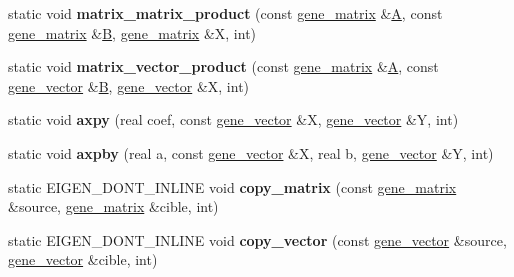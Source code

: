 \begin{DoxyCompactItemize}
\mbox{\label{classtensor__interface_a77f641ab91d01c341f26af6a5ee6c194}} 
static void {\bfseries matrix\+\_\+matrix\+\_\+product} (const \hyperlink{class_eigen_1_1_tensor}{gene\+\_\+matrix} \&\hyperlink{group___core___module_class_eigen_1_1_matrix}{A}, const \hyperlink{class_eigen_1_1_tensor}{gene\+\_\+matrix} \&\hyperlink{group___core___module_class_eigen_1_1_matrix}{B}, \hyperlink{class_eigen_1_1_tensor}{gene\+\_\+matrix} \&X, int)
\item 
\mbox{\label{classtensor__interface_a8c859c9a56554907eff907233548241a}} 
static void {\bfseries matrix\+\_\+vector\+\_\+product} (const \hyperlink{class_eigen_1_1_tensor}{gene\+\_\+matrix} \&\hyperlink{group___core___module_class_eigen_1_1_matrix}{A}, const \hyperlink{class_eigen_1_1_tensor}{gene\+\_\+vector} \&\hyperlink{group___core___module_class_eigen_1_1_matrix}{B}, \hyperlink{class_eigen_1_1_tensor}{gene\+\_\+vector} \&X, int)
\item 
\mbox{\label{classtensor__interface_a39db73e71870bccd9bf1003f00b6d921}} 
static void {\bfseries axpy} (real coef, const \hyperlink{class_eigen_1_1_tensor}{gene\+\_\+vector} \&X, \hyperlink{class_eigen_1_1_tensor}{gene\+\_\+vector} \&Y, int)
\item 
\mbox{\label{classtensor__interface_a82ae19986ec5ce20916994cb6bdff53c}} 
static void {\bfseries axpby} (real a, const \hyperlink{class_eigen_1_1_tensor}{gene\+\_\+vector} \&X, real b, \hyperlink{class_eigen_1_1_tensor}{gene\+\_\+vector} \&Y, int)
\item 
\mbox{\label{classtensor__interface_a1eceb8d5c423dd31f0da851c33a77000}} 
static E\+I\+G\+E\+N\+\_\+\+D\+O\+N\+T\+\_\+\+I\+N\+L\+I\+NE void {\bfseries copy\+\_\+matrix} (const \hyperlink{class_eigen_1_1_tensor}{gene\+\_\+matrix} \&source, \hyperlink{class_eigen_1_1_tensor}{gene\+\_\+matrix} \&cible, int)
\item 
\mbox{\label{classtensor__interface_a7d6a1019a054d36122b0cc1e753fca8c}} 
static E\+I\+G\+E\+N\+\_\+\+D\+O\+N\+T\+\_\+\+I\+N\+L\+I\+NE void {\bfseries copy\+\_\+vector} (const \hyperlink{class_eigen_1_1_tensor}{gene\+\_\+vector} \&source, \hyperlink{class_eigen_1_1_tensor}{gene\+\_\+vector} \&cible, int)
\end{DoxyCompactItemize}


